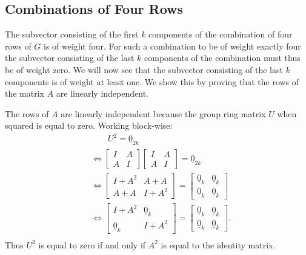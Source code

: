 \subsection{Combinations of Four Rows}
\label{sect:gencombsfourrows}
The subvector consisting of the first $k$ components of the combination of four rows of $G$ is of weight four.
For such a combination to be of weight exactly four the subvector consisting of the last $k$ components of the combination must thus be of weight zero.
We will now see that the subvector consisting of the last $k$ components is of weight at least one.
We show this by proving that the rows of the matrix $A$ are linearly independent.

The rows of $A$ are linearly independent because the group ring matrix $U$ when squared is equal to zero.
Working block-wise:
\begin{equation*}
\begin{split}
&\qquad U^2 = \underline{0}_{2k} \\
&\Leftrightarrow \left[ \begin{array}{cc} I & A \\ A & I \end{array} \right] \left[ \begin{array}{cc} I & A \\ A & I \end{array} \right] = \underline{0}_{2k} \\
&\Leftrightarrow \left[ \begin{array}{cc} I + A^2 & A + A \\ A + A & I + A^2 \end{array} \right]  = \left[ \begin{array}{cc} \underline{0}_{k} & \underline{0}_{k} \\ \underline{0}_{k} & \underline{0}_{k} \end{array} \right] \\
&\Leftrightarrow \left[ \begin{array}{cc} I + A^2 & \underline{0}_{k} \\ \underline{0}_{k} & I + A^2 \end{array} \right]  = \left[ \begin{array}{cc} \underline{0}_{k} & \underline{0}_{k} \\ \underline{0}_{k} & \underline{0}_{k} \end{array} \right]. \\
\end{split}
\end{equation*}
Thus $U^2$ is equal to zero if and only if $A^2$ is equal to the identity matrix.

